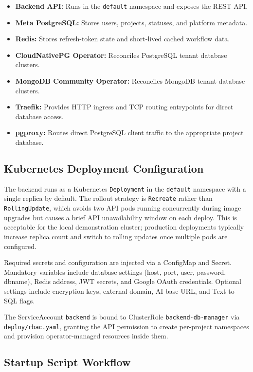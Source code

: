 \begin{itemize}
    \item \textbf{Backend API:} Runs in the \texttt{default} namespace and exposes the REST API.
    \item \textbf{Meta PostgreSQL:} Stores users, projects, statuses, and platform metadata.
    \item \textbf{Redis:} Stores refresh-token state and short-lived cached workflow data.
    \item \textbf{CloudNativePG Operator:} Reconciles PostgreSQL tenant database clusters.
    \item \textbf{MongoDB Community Operator:} Reconciles MongoDB tenant database clusters.
    \item \textbf{Traefik:} Provides HTTP ingress and TCP routing entrypoints for direct database access.
    \item \textbf{pgproxy:} Routes direct PostgreSQL client traffic to the appropriate project database.
\end{itemize}

\subsection{Kubernetes Deployment Configuration}

The backend runs as a Kubernetes \texttt{Deployment} in the \texttt{default} namespace with a single replica by default. The rollout strategy is \texttt{Recreate} rather than \texttt{RollingUpdate}, which avoids two API pods running concurrently during image upgrades but causes a brief API unavailability window on each deploy. This is acceptable for the local demonstration cluster; production deployments typically increase replica count and switch to rolling updates once multiple pods are configured.

Required secrets and configuration are injected via a ConfigMap and Secret. Mandatory variables include database settings (host, port, user, password, dbname), Redis address, JWT secrets, and Google OAuth credentials. Optional settings include encryption keys, external domain, AI base URL, and Text-to-SQL flags.

The ServiceAccount \texttt{backend} is bound to ClusterRole \texttt{backend-db-manager} via \texttt{deploy/rbac.yaml}, granting the API permission to create per-project namespaces and provision operator-managed resources inside them.

\subsection{Startup Script Workflow}

